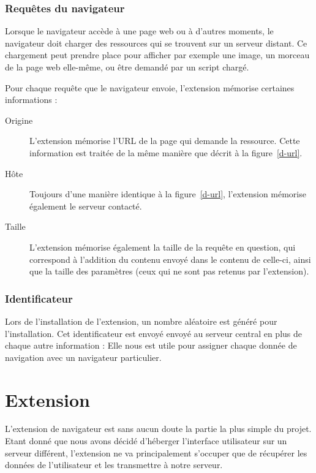 		\subsubsection{Requêtes du navigateur}

			Lorsque le navigateur accède à une page web ou à d'autres moments, le navigateur doit charger des ressources qui se trouvent sur un serveur distant. Ce chargement peut prendre place pour afficher par exemple une image, un morceau de la page web elle-même, ou être demandé par un script chargé.

			Pour chaque requête que le navigateur envoie, l'extension mémorise certaines informations : 
			\begin{description}
				\item[Origine] L'extension mémorise l'URL de la page qui demande la ressource. Cette information est traitée de la même manière que décrit à la figure~\ref{d-url}.
				\item[Hôte] Toujours d'une manière identique à la figure~\ref{d-url}, l'extension mémorise également le serveur contacté.
				\item[Taille] L'extension mémorise également la taille de la requête en question, qui correspond à l'addition du contenu envoyé dans le contenu de celle-ci, ainsi que la taille des paramètres (ceux qui ne sont pas retenus par l'extension).
			\end{description}

		\subsubsection{Identificateur}

			Lors de l'installation de l'extension, un nombre aléatoire est généré pour l'installation. Cet identificateur est envoyé envoyé au serveur central en plus de chaque autre information : Elle nous est utile pour assigner chaque donnée de navigation avec un navigateur particulier.

\section{Extension}

	L'extension de navigateur est sans aucun doute la partie la plus simple du projet. Etant donné que nous avons décidé d'héberger l'interface utilisateur sur un serveur différent, l'extension ne va principalement s'occuper que de récupérer les données de l'utilisateur et les transmettre à notre serveur.

